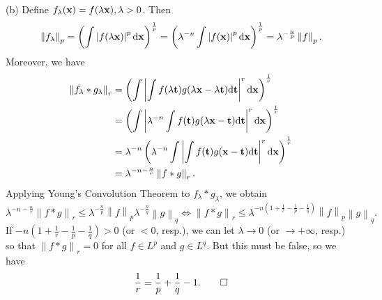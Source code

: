 \begin{exercise}{9.2}
  (b) Define $f_{\lambda}(\mathbf{x}) = f(\lambda \mathbf{x}), \lambda > 0$.
  Then
  \[
    \left\| f_\lambda \right\|_p
    = \left( \int \left|f(\lambda \mathbf{x})\right|^p \mathrm{d} \mathbf{x} \right)^{\frac 1p}
    = \left( \lambda^{-n} \int \left|f(\mathbf{x})\right|^p \mathrm{d} \mathbf{x} \right)^{\frac 1p}
    = \lambda^{-\frac{n}{p}} \left\| f \right\|_p.
  \]
  Moreover, we have
  \[
    \begin{aligned}
      \left\| f_{\lambda}*g_{\lambda} \right\|_r
      &= \left( \int \left|
      \int f(\lambda\mathbf{t}) g(\lambda\mathbf{x}-\lambda\mathbf{t}) \mathrm{d} \mathbf{t}
      \right|^r \mathrm{d} \mathbf{x} \right)^{\frac 1r} \\
      &= \left( \int \left|
      \lambda^{-n} \int f(\mathbf{t}) g(\lambda\mathbf{x}-\mathbf{t}) \mathrm{d} \mathbf{t}
      \right|^r \mathrm{d} \mathbf{x} \right)^{\frac 1r} \\
      &= \lambda^{-n} \left( \lambda^{-n} \int \left|
      \int f(\mathbf{t}) g(\mathbf{x}-\mathbf{t}) \mathrm{d} \mathbf{t}
      \right|^r \mathrm{d} \mathbf{x} \right)^{\frac 1r} \\
      &= \lambda^{-n - \frac nr} \left\| f*g \right\|_r.
    \end{aligned}
  \]
  Applying Young's Convolution Theorem to $f_{\lambda} * g_{\lambda}$,
  we obtain
  \[
    \lambda^{-n - \frac nr} \left\| f*g \right\|_r
    \le \lambda^{-\frac n p} \left\| f \right\|_p
    \lambda^{-\frac n q} \left\| g \right\|_q
    \Longleftrightarrow
    \left\| f*g \right\|_r \le
    \lambda^{-n\left( 1 + \frac1r - \frac 1p - \frac 1q \right)}
    \left\| f \right\|_p \left\| g \right\|_q.
  \]
  If $-n\left( 1 + \frac1r - \frac 1p - \frac 1q \right) > 0$
  (or $<0$, resp.),
  we can let $\lambda \rightarrow 0$
  (or $\rightarrow +\infty$, resp.)
  so that $\left\| f*g \right\|_r = 0$ for all $f \in L^p$ and $g \in L^q$.
  But this must be false, so we have
  \[
    \frac{1}{r} = \frac{1}{p} + \frac{1}{q} - 1.
    \qedhere
  \]
\end{exercise}

